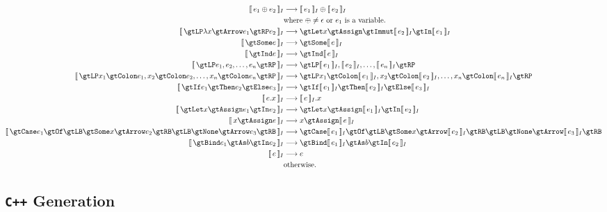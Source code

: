 \documentclass{article}
\begin{document}
    \begin{align*}
        \eqI{e_1 \oplus e_2}{\intI{e_1} \oplus \intI{e_2}}{where $\oplus \neq \epsilon$ or $e_1$ is a variable.} \\
        \eqI{\gtLP \lambda x \gtArrow e_1 \gtRP e_2}{\gtLet x \gtAssign \gtImmut \intI{e_2} \gtIn \intI{e_1}}{} \\
        \eqI{\gtSome e}{\gtSome \intI{e}}{} \\
        \eqI{\gtInd e}{\gtInd \intI{e}}{} \\
        \eqI{\gtLP e_1, e_2, \ldots, e_n \gtRP}{\gtLP \intI{e_1}, \intI{e_2}, \ldots, \intI{e_n} \gtRP}{} \\
        \eqI{\gtLP x_1 \gtColon e_1, x_2 \gtColon e_2, \ldots, x_n \gtColon e_n \gtRP}
            {\gtLP x_1 \gtColon \intI{e_1}, x_2 \gtColon \intI{e_2}, \ldots, x_n \gtColon \intI{e_n} \gtRP}{} \\
        \eqI{\gtIf e_1 \gtThen e_2 \gtElse e_3}{\gtIf \intI{e_1} \gtThen \intI{e_2} \gtElse \intI{e_3}}{} \\
        \eqI{e.x}{\intI{e}.x}{} \\
        \eqI{\gtLet x \gtAssign e_1 \gtIn e_2}{\gtLet x \gtAssign \intI{e_1} \gtIn \intI{e_2}}{} \\
        \eqI{x \gtAssign e}{x \gtAssign \intI{e}}{} \\
        \eqI{\gtCase e_1 \gtOf \gtLB \gtSome x \gtArrow e_2 \gtRB
                \gtLB \gtNone \gtArrow e_3 \gtRB}
            {\gtCase \intI{e_1} \gtOf \gtLB \gtSome x \gtArrow \intI{e_2} \gtRB
                \gtLB \gtNone \gtArrow \intI{e_3} \gtRB}
            {} \\
        \eqI{\gtBind e_1 \gtAs b \gtIn e_2}{\gtBind \intI{e_1} \gtAs b \gtIn \intI{e_2}}{} \\
        \eqI{e}{e}{otherwise.}
    \end{align*}

    \subsection{\texttt{C++} Generation}
\end{document}
